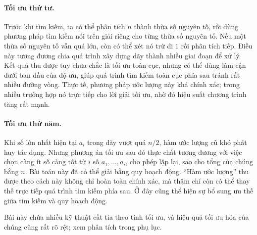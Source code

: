 \documentclass[11pt]{article}
\begin{document}
\paragraph{Tối ưu thứ tư.}
Trước khi tìm kiếm, ta có thể phân tích \(n\) thành thừa số nguyên tố, rồi
dùng phương pháp tìm kiếm nói trên giải riêng cho từng thừa số nguyên tố. Nếu
một thừa số nguyên tố vẫn quá lớn, còn có thể xét nó trừ đi \(1\) rồi phân
tích tiếp. Điều này tương đương chia quá trình xây dựng dãy thành nhiều giai
đoạn để xử lý. Kết quả thu được tuy chưa chắc là tối ưu toàn cục, nhưng có
thể dùng làm cận dưới ban đầu của độ ưu, giúp quá trình tìm kiếm toàn cục
phía sau tránh rất nhiều đường vòng. Thực tế, phương pháp ước lượng này khá
chính xác; trong nhiều trường hợp nó trực tiếp cho lời giải tối ưu, nhờ đó
hiệu suất chương trình tăng rất mạnh.

\paragraph{Tối ưu thứ năm.}
Khi số lớn nhất hiện tại \(a_i\) trong dãy vượt quá \(n/2\), hàm ước lượng cũ
khó phát huy tác dụng. Nhưng phương án tối ưu sau đó thực chất tương đương
với việc chọn càng ít số càng tốt từ \(i\) số \(a_1,\ldots,a_i\), cho phép lặp
lại, sao cho tổng của chúng bằng \(n\). Bài toán này đã có thể giải bằng quy
hoạch động. ``Hàm ước lượng'' thu được theo cách này không chỉ hoàn toàn
chính xác, mà thậm chí còn có thể thay thế trực tiếp quá trình tìm kiếm phía
sau. Ở đây cũng thể hiện sự bổ sung ưu thế giữa tìm kiếm và quy hoạch động.

Bài này chứa nhiều kỹ thuật cắt tỉa theo tính tối ưu, và hiệu quả tối ưu hóa
của chúng cũng rất rõ rệt; xem phân tích trong phụ lục.
\end{document}
